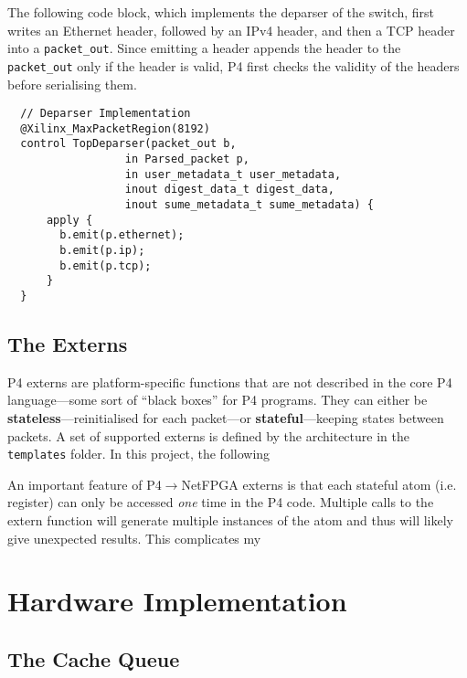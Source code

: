 The following code block, which implements the deparser of the switch, first writes an Ethernet header, followed by an IPv4 header, and then a TCP header into a \verb|packet_out|. Since emitting a header appends the header to the \verb|packet_out| only if the header is valid, P4 first checks the validity of the headers before serialising them.

{\renewcommand{\baselinestretch}{0.8}\small
\begin{verbatim}
  // Deparser Implementation
  @Xilinx_MaxPacketRegion(8192)
  control TopDeparser(packet_out b,
                  in Parsed_packet p,
                  in user_metadata_t user_metadata,
                  inout digest_data_t digest_data, 
                  inout sume_metadata_t sume_metadata) { 
      apply {
        b.emit(p.ethernet); 
        b.emit(p.ip);
        b.emit(p.tcp);
      }
  }
\end{verbatim}
}
		
	\subsection{The Externs}
P4 externs are platform-specific functions that are not described in the core P4 language---some sort of ``black boxes'' for P4 programs. They can either be \textbf{stateless}---reinitialised for each packet---or \textbf{stateful}---keeping states between packets. A set of supported externs is defined by the architecture in the \texttt{templates} folder. In this project, the following 

An important feature of P4$\rightarrow$NetFPGA externs is that each stateful atom (i.e. register) can only be accessed \textit{one} time in the P4 code. Multiple calls to the extern function will generate multiple instances of the atom and thus will likely give unexpected results. This complicates my 

\section{Hardware Implementation}
	\subsection{The Cache Queue}
	
